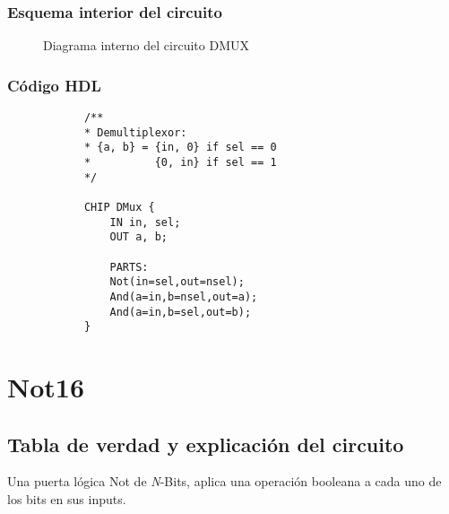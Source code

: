 \documentclass[12pt]{article}
\begin{document}
		\subsubsection{Esquema interior del circuito}
		\begin{figure}[H]
			\centering
			
			\caption{Diagrama interno del circuito DMUX} \cite{diagram}
			\label{fig:enter-label}
		\end{figure}
		\newpage \subsubsection{Código HDL}
		\begin{lstlisting}
			/**
			* Demultiplexor:
			* {a, b} = {in, 0} if sel == 0
			*          {0, in} if sel == 1
			*/

			CHIP DMux {
				IN in, sel;
				OUT a, b;

				PARTS:
				Not(in=sel,out=nsel);
				And(a=in,b=nsel,out=a);
				And(a=in,b=sel,out=b);
			}
		\end{lstlisting}
		\newpage

		\section{Not16}
		\subsection{Tabla de verdad y explicación del circuito}

		Una puerta lógica Not de \textit{N}-Bits, aplica una operación booleana a cada uno de los bits en sus inputs. \cite{nisan_nand2tetris_2005}

		\begin{table}[H]
			\centering
			\caption{Tabla de verdad de NOT16}
			\label{tab:tab_not16}
		\end{table}
\end{document}
